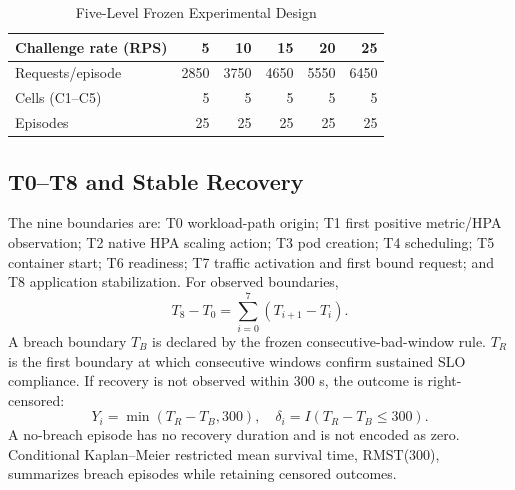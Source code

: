 \documentclass[10pt,twocolumn]{article}
\begin{document}
\begin{table}[t]
\centering
\caption{Five-Level Frozen Experimental Design}
\label{tab:design}
\begin{tabular}{lrrrrr}
\toprule
Challenge rate (RPS) & 5 & 10 & 15 & 20 & 25\\
\midrule
Requests/episode & 2850 & 3750 & 4650 & 5550 & 6450\\
Cells (C1--C5) & 5 & 5 & 5 & 5 & 5\\
Episodes & 25 & 25 & 25 & 25 & 25\\
\bottomrule
\end{tabular}
\end{table}

\subsection{T0--T8 and Stable Recovery}
The nine boundaries are: T0 workload-path origin; T1 first positive metric/HPA observation; T2 native HPA scaling action; T3 pod creation; T4 scheduling; T5 container start; T6 readiness; T7 traffic activation and first bound request; and T8 application stabilization. For observed boundaries,
\begin{equation}
T_8-T_0=\sum_{i=0}^{7}(T_{i+1}-T_i).
\end{equation}
A breach boundary $T_B$ is declared by the frozen consecutive-bad-window rule. $T_R$ is the first boundary at which consecutive windows confirm sustained SLO compliance. If recovery is not observed within 300 s, the outcome is right-censored:
\begin{equation}
Y_i=\min(T_R-T_B,300),\quad \delta_i=I(T_R-T_B\leq300).
\end{equation}
A no-breach episode has no recovery duration and is not encoded as zero. Conditional Kaplan--Meier restricted mean survival time, RMST(300), summarizes breach episodes while retaining censored outcomes.

\begin{table}[t]
\centering
\caption{Operational T0--T8 Recovery Boundaries}
\label{tab:boundaries}
\end{table}
\end{document}
